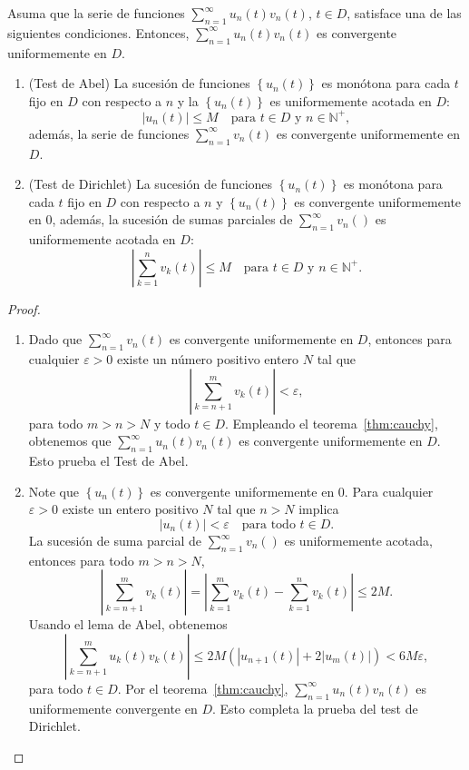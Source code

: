 \begin{theorem}
	Asuma que la serie de funciones $\sum_{n=1}^{\infty}u_{n}\left(t\right)v_{n}\left(t\right)$, $t\in D$, satisface una de las siguientes condiciones. Entonces, $\sum_{n=1}^{\infty}u_{n}\left(t\right)v_{n}\left(t\right)$ es convergente uniformemente en $D$.
	\begin{enumerate}
		\item (Test de Abel) La sucesión de funciones $\left\{u_{n}\left(t\right)\right\}$ es monótona para cada $t$ fijo en $D$ con respecto a $n$ y la $\left\{u_{n}\left(t\right)\right\}$ es uniformemente acotada en $D$: \[ \left|u_{n}\left(t\right)\right|\leq M\quad\text{para }t\in D\text{ y }n\in\mathds{N}^{+}, \] además, la serie de funciones $\sum_{n=1}^{\infty}v_{n}\left(t\right)$ es convergente uniformemente en $D$.
		\item (Test de Dirichlet) La sucesión de funciones $\left\{u_{n}\left(t\right)\right\}$ es monótona para cada $t$ fijo en $D$ con respecto a $n$ y $\left\{u_{n}\left(t\right)\right\}$ es convergente uniformemente en $0$, además, la sucesión de sumas parciales de $\sum_{n=1}^{\infty}v_{n}\left(\right)$ es uniformemente acotada en $D$: \[ \left|\sum_{k=1}^{n}v_{k}\left(t\right)\right|\leq M\quad\text{para }t\in D\text{ y }n\in\mathds{N}^{+}. \]
	\end{enumerate}
\end{theorem}
\begin{proof}\leavevmode
	\begin{enumerate}
		\item Dado que $\sum_{n=1}^{\infty}v_{n}\left(t\right)$ es convergente uniformemente en $D$, entonces para cualquier $\varepsilon>0$ existe un número positivo entero $N$ tal que \[ \left|\sum_{k=n+1}^{m}v_{k}\left(t\right)\right|<\varepsilon, \] para todo $m>n>N$ y todo $t\in D$. Empleando el teorema~\ref{thm:cauchy}, obtenemos que $\sum_{n=1}^{\infty}u_{n}\left(t\right)v_{n}\left(t\right)$ es convergente uniformemente en $D$. Esto prueba el Test de Abel.
		\item Note que $\left\{u_{n}\left(t\right)\right\}$ es convergente uniformemente en $0$. Para cualquier $\varepsilon>0$ existe un entero positivo $N$ tal que $n>N$ implica \[ \left|u_{n}\left(t\right)\right|<\varepsilon\quad\text{para todo }t\in D. \] La sucesión de suma parcial de $\sum_{n=1}^{\infty}v_{n}\left(\right)$ es uniformemente acotada, entonces para todo $m>n>N$, \[ \left|\sum_{k=n+1}^{m}v_{k}\left(t\right)\right|=\left|\sum_{k=1}^{m}v_{k}\left(t\right)-\sum_{k=1}^{n}v_{k}\left(t\right)\right|\leq 2M. \] Usando el lema de Abel, obtenemos \[ \left|\sum_{k=n+1}^{m}u_{k}\left(t\right)v_{k}\left(t\right)\right|\leq 2M\left(\left|u_{n+1}\left(t\right)\right|+2\left|u_{m}\left(t\right)\right|\right)<6M\varepsilon, \] para todo $t\in D$. Por el teorema~\ref{thm:cauchy}, $\sum_{n=1}^{\infty}u_{n}\left(t\right)v_{n}\left(t\right)$ es uniformemente convergente en $D$. Esto completa la prueba del test de Dirichlet.
	\end{enumerate}
\end{proof}
